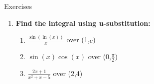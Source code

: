 \documentclass[../revisedmain.tex]{subfiles}
\begin{document}
	\begin{center}
		\LARGE Exercises
	\end{center}
	\begin{enumerate}
		\item \textbf{Find the integral using u-substitution:}
		\begin{enumerate}
			\item $\frac{\sin(\ln(x))}{x}$ over (1,$e$)
			\item $\sin(x)\cos(x)$ over (0,$\frac{\pi}{2}$)
			\item $\frac{2x+1}{x^2+x-5}$ over (2,4)
		\end{enumerate}
	\end{enumerate}
\end{document}
